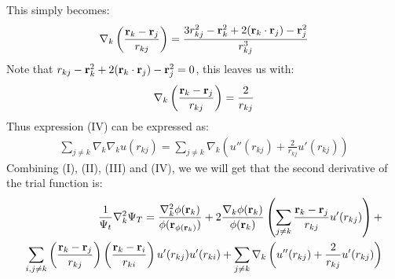 \documentclass[a4paper, 10pt]{article}
\begin{document}
This simply becomes:
\begin{align}
  \nabla_{k}
  \left(\frac{\bold{r}_{k} - \bold{r}_{j}}{r_{kj}}\right)
  = \frac{3r_{kj}^2 - \bold{r}^2_{k} + 2(\bold{r}_{k}\cdot \bold{r}_{j}) - \bold{r}^2_{j}}{r_{kj}^3}
\end{align}
Note that $r_{kj} - \bold{r}^2_{k} + 2(\bold{r}_{k}\cdot \bold{r}_{j}) - \bold{r}^2_{j} = 0$, this leaves us with:
\begin{align}
  \nabla_{k}
  \left(\frac{\bold{r}_{k} - \bold{r}_{j}}{r_{kj}}\right)
  = \frac{2}{r_{kj}}
\end{align}
Thus expression (IV) can be expressed as:
\begin{align}
  \sum_{j \neq k}\nabla_{k}\nabla_{k}u(r_{kj}) =
  \sum_{j \neq k}\nabla_{k}\left(u''(r_{kj}) + \frac{2}{r_{kj}}u'(r_{kj})
\right)
\end{align}
Combining (I), (II), (III) and (IV), we we will get that the second derivative
of the trial function is:
\begin{align}
  \begin{split}
  \frac{1}{\Psi_{t}}\nabla_{k}^2\Psi_{T} =
  \frac{\nabla_{k}^2\phi{(\bold{r}_{k})}}{\phi(\bold{r}_{\phi(\bold{r}_{k})})}
  +
  2\frac{\nabla_{k}\phi(\bold{r}_{k})}{\phi{(\bold{r}_{k})}}\left(\sum_{j\neq k}\frac{\bold{r}_{k} - \bold{r}_{j}}{r_{kj}}u'(r_{kj})\right)
  +\\
  \sum_{i, j\neq k}\left(\frac{\bold{r}_{k} - \bold{r}_{j}}{r_{kj}}\right)
  \left(\frac{\bold{r}_{k} - \bold{r}_{i}}{r_{ki}}\right)u'(r_{kj})u'(r_{ki})
  +
  \sum_{j \neq k}\nabla_{k}\left(u''(r_{kj}) + \frac{2}{r_{kj}}u'(r_{kj})\right)
\end{split}
\end{align}
\end{document}
